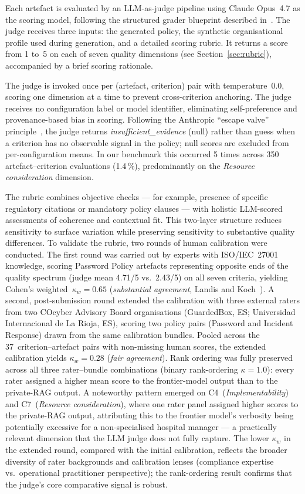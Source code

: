 \documentclass[runningheads]{llncs}
\begin{document}
Each artefact is evaluated by an LLM-as-judge pipeline using Claude
Opus~4.7 as the scoring model, following the structured grader blueprint
described in~\cite{anthropic2024demystifying}. The judge receives three
inputs: the generated policy, the synthetic organisational profile used
during generation, and a detailed scoring rubric. It returns a score from
1 to~5 on each of seven quality dimensions (see Section~\ref{sec:rubric}),
accompanied by a brief scoring rationale.

The judge is invoked once per (artefact, criterion) pair with
temperature~0.0, scoring one dimension at a time to prevent
cross-criterion anchoring. The judge receives no configuration label or
model identifier, eliminating self-preference and provenance-based bias
in scoring. Following the Anthropic ``escape valve''
principle~\cite{anthropic2024demystifying}, the judge returns
\textit{insufficient\_evidence} (null) rather than guess when a criterion
has no observable signal in the policy; null scores are excluded from
per-configuration means. In our benchmark this occurred 5 times across
350 artefact--criterion evaluations (1.4\,\%), predominantly on the
\textit{Resource consideration} dimension.

The rubric combines objective checks — for example, presence of specific
regulatory citations or mandatory policy clauses — with holistic LLM-scored
assessments of coherence and contextual fit. This two-layer structure
reduces sensitivity to surface variation while preserving sensitivity to
substantive quality differences.
To validate the rubric, two rounds of human calibration were conducted.
The first round was carried out by experts with ISO/IEC~27001 knowledge,
scoring Password Policy artefacts representing opposite ends of the quality
spectrum (judge mean 4.71/5 vs.\ 2.43/5) on all seven criteria, yielding
Cohen's weighted~$\kappa_w = 0.65$ (\textit{substantial agreement},
Landis and Koch~\cite{landiskoch1977}).
A second, post-submission round extended the calibration with three
external raters from two COcyber Advisory Board organisations
(GuardedBox, ES; Universidad Internacional de La Rioja, ES), scoring
two policy pairs (Password and Incident Response) drawn from the same
calibration bundles.
Pooled across the 37~criterion--artefact pairs with non-missing human
scores, the extended calibration yields $\kappa_w = 0.28$ (\textit{fair
agreement}).
Rank ordering was fully preserved across all three rater--bundle
combinations (binary rank-ordering $\kappa = 1.0$): every rater assigned
a higher mean score to the frontier-model output than to the private-RAG
output.
A noteworthy pattern emerged on C4~(\textit{Implementability}) and
C7~(\textit{Resource consideration}), where one rater panel assigned
higher scores to the private-RAG output, attributing this to the frontier
model's verbosity being potentially excessive for a non-specialised
hospital manager --- a practically relevant dimension that the LLM judge
does not fully capture.
The lower $\kappa_w$ in the extended round, compared with the initial
calibration, reflects the broader diversity of rater backgrounds and
calibration lenses (compliance expertise vs.\ operational practitioner
perspective); the rank-ordering result confirms that the judge's core
comparative signal is robust.
\end{document}
